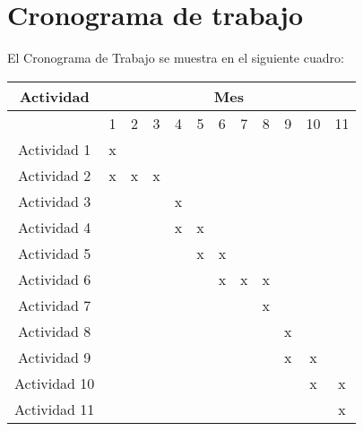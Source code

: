 \documentclass[10pt]{article}
\begin{document}
\section{Cronograma de trabajo}

El Cronograma de Trabajo se muestra en el siguiente cuadro:

\begin{table}[!ht]
	\renewcommand{\arraystretch}{1.5}
	\label{tab:kurskew}
	\begin{center}
		\begin{tabular}{| c | c | c | c | c | c | c | c | c | c | c |c |}\cline{1-12}
			\multicolumn{1}{|c|}{Actividad} & \multicolumn{11}{|c|}{Mes}\\ \hline
			\multicolumn{1}{|c|}{ } &	\multicolumn{1}{|c|}{ 1} & 					\multicolumn{1}{|c|}{2} & \multicolumn{1}{|c|}{3} & 		\multicolumn{1}{|c|}{4} & \multicolumn{1}{|c|}{ 5} & 					\multicolumn{1}{|c|}{6} & \multicolumn{1}{|c|}{7} & 		\multicolumn{1}{|c|}{8} & \multicolumn{1}{|c|}{ 9} & 					\multicolumn{1}{|c|}{10} & \multicolumn{1}{|c|}{11} \\ \hline
			Actividad 1 & x & & & & & & & & & & \\ \hline
			Actividad 2 & x & x & x & & & & & & & & \\ \hline
			Actividad 3 & & & & x & & & & & & & \\ \hline
			Actividad 4 & & & & x & x & & & & & & \\ \hline
			Actividad 5 & & & & & x & x & & & & & \\ \hline
			Actividad 6 & & & & & & x & x & x & & & \\ \hline
			Actividad 7 & & & & & & & & x & & & \\ \hline
			Actividad 8 & & & & & & & & & x & & \\ \hline
			Actividad 9 & & & & & & & & & x & x & \\ \hline
			Actividad 10 & & & & & & & & & & x & x \\ \hline
			Actividad 11 & & & & & & & & & & & x \\ \hline
		\end{tabular}
	\end{center}
\end{table}
\end{document}
